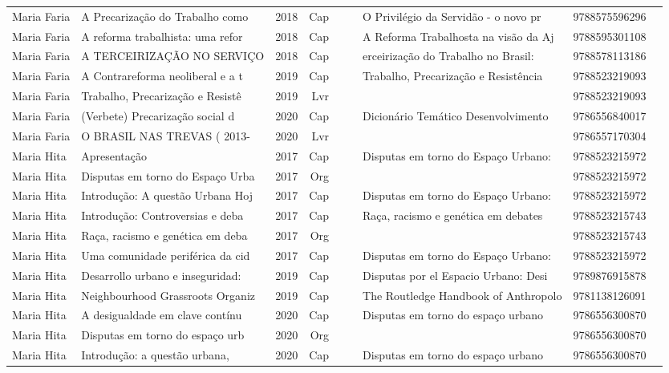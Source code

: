 \documentclass[12pt,brazil]{article}\usepackage[]{graphicx}\usepackage[]{xcolor}
\begin{document}
\begin{longtable}{lllrrllrr}
Maria Faria & A Precarização do Trabalho como  & 2018 & Cap &  &  & O Privilégio da Servidão - o novo pr & 9788575596296 \\
Maria Faria & A reforma trabalhista: uma refor & 2018 & Cap &  &  & A Reforma Trabalhosta na visão da Aj & 9788595301108 \\
Maria Faria & A TERCEIRIZAÇÃO NO SERVIÇO  & 2018 & Cap &  &  & erceirização do Trabalho no Brasil:  & 9788578113186 \\
\rowcolor{capdup}Maria Faria & A Contrareforma neoliberal e a t & 2019 & Cap &  &  & Trabalho, Precarização e Resistência & 9788523219093 \\
Maria Faria & Trabalho, Precarização e Resistê & 2019 & Lvr &  &  &  & 9788523219093 \\
Maria Faria & (Verbete)  Precarização social d & 2020 & Cap &  &  & Dicionário Temático Desenvolvimento  & 9786556840017 \\
Maria Faria & O BRASIL NAS TREVAS ( 2013- & 2020 & Lvr &  &  &  & 9786557170304 \\
Maria Hita & Apresentação & 2017 & Cap &  &  & Disputas em torno do Espaço Urbano:  & 9788523215972 \\
Maria Hita & Disputas em torno do Espaço Urba & 2017 & Org &  &  &  & 9788523215972 \\
Maria Hita & Introdução: A questão Urbana Hoj & 2017 & Cap &  &  & Disputas em torno do Espaço Urbano:  & 9788523215972 \\
Maria Hita & Introdução: Controversias e deba & 2017 & Cap &  &  & Raça, racismo e genética em debates  & 9788523215743 \\
Maria Hita & Raça, racismo e genética em deba & 2017 & Org &  &  &  & 9788523215743 \\
Maria Hita & Uma comunidade periférica da cid & 2017 & Cap &  &  & Disputas em torno do Espaço Urbano:  & 9788523215972 \\
Maria Hita & Desarrollo urbano e inseguridad: & 2019 & Cap &  &  & Disputas por el Espacio Urbano: Desi & 9789876915878 \\
Maria Hita & Neighbourhood Grassroots Organiz & 2019 & Cap &  &  & The Routledge Handbook of Anthropolo & 9781138126091 \\
Maria Hita & A desigualdade em clave contínu & 2020 & Cap &  &  & Disputas em torno do espaço urbano  & 9786556300870 \\
Maria Hita & Disputas em torno do espaço urb & 2020 & Org &  &  &  & 9786556300870 \\
Maria Hita & Introdução: a questão urbana, & 2020 & Cap &  &  & Disputas em torno do espaço urbano  & 9786556300870 \\

\end{longtable}
\end{document}

